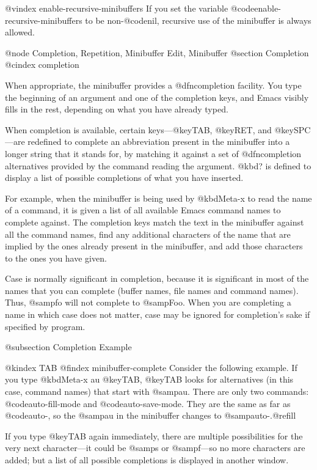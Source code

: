 {{@vindex enable-recursive-minibuffers
  If you set the variable @code{enable-recursive-minibuffers} to be
non-@code{nil}, recursive use of the minibuffer is always allowed.

@node Completion, Repetition, Minibuffer Edit, Minibuffer
@section Completion
@cindex completion

  When appropriate, the minibuffer provides a @dfn{completion} facility.
You type the beginning of an argument and one of the completion keys,
and Emacs visibly fills in the rest, depending on what you have already
typed.

  When completion is available, certain keys---@key{TAB}, @key{RET}, and
@key{SPC}---are redefined to complete an abbreviation present in the
minibuffer into a longer string that it stands for, by matching it
against a set of @dfn{completion alternatives} provided by the command
reading the argument.  @kbd{?} is defined to display a list of possible
completions of what you have inserted.

  For example, when the minibuffer is being used by @kbd{Meta-x} to read
the name of a command, it is given a list of all available Emacs command
names to complete against.  The completion keys match the text in the
minibuffer against all the command names, find any additional characters of
the name that are implied by the ones already present in the minibuffer,
and add those characters to the ones you have given.

  Case is normally significant in completion, because it is significant in
most of the names that you can complete (buffer names, file names and
command names).  Thus, @samp{fo} will not complete to @samp{Foo}.  When you
are completing a name in which case does not matter, case may be ignored
for completion's sake if specified by program.

@subsection Completion Example

@kindex TAB
@findex minibuffer-complete
  Consider the following example.  If you type @kbd{Meta-x au @key{TAB}},
@key{TAB} looks for alternatives (in this case, command names) that
start with @samp{au}.  There are only two commands: @code{auto-fill-mode} and
@code{auto-save-mode}.  They are the same as far as @code{auto-}, so the
@samp{au} in the minibuffer changes to @samp{auto-}.@refill

  If you type @key{TAB} again immediately, there are multiple possibilities
for the very next character---it could be @samp{s} or @samp{f}---so no more
characters are added; but a list of all possible completions is displayed
in another window.

}}
